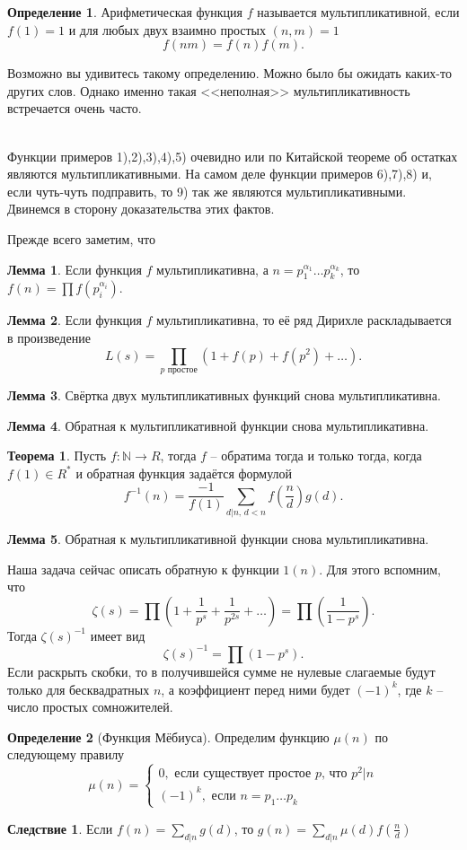 \documentclass[10pt,a4paper,oneside]{book}
\theoremstyle{definition}
\newtheorem{defn}{Определение}
\newtheorem{thm}{Теорема}
\newtheorem{lem}{Лемма}
\newtheorem{cor}{Следствие}
\newcommand{\mb}[1]{\mathbb{#1}}
\def\exm{\noindent {\bf Примеры:}}
\def\thrm{\begin{thm}}
\def\ethrm{\end{thm}}
\def\dfn{\begin{defn}}
\def\edfn{\end{defn}}
\def\lm{\begin{lem}}
\def\elm{\end{lem}}
\def\crl{\begin{cor}}
\def\ecrl{\end{cor}}
\begin{document}
\dfn Арифметическая функция $f$ называется мультипликативной, если $f(1)=1$ и для любых двух взаимно простых $(n,m)=1$ 
$$f(nm)=f(n)f(m).$$ 
\edfn
Возможно вы удивитесь такому определению. Можно было бы ожидать каких-то других слов. Однако именно такая <<неполная>> мультипликативность встречается очень часто.

\exm\\
Функции примеров 1),2),3),4),5) очевидно или по Китайской теореме об остатках являются мультипликативными. На самом деле функции примеров 6),7),8) и, если чуть-чуть подправить, то 9) так же являются мультипликативными. Двинемся в сторону доказательства этих фактов.

Прежде всего заметим, что 
\lm Если функция $f$ мультипликативна, а $n=p_1^{\alpha_1}\dots p_k^{\alpha_k}$, то $f(n)=\prod f(p_i^{\alpha_i})$.
\elm

\lm Если функция $f$ мультипликативна, то её ряд Дирихле раскладывается в произведение
$$L(s)=\prod_{p \text{ простое}} (1+f(p)+f(p^2)+\dots).$$
\elm

\lm Свёртка двух мультипликативных функций снова мультипликативна.
\elm

\lm Обратная к мультипликативной функции снова мультипликативна.
\elm

\thrm Пусть $f\colon \mb N \to R$, тогда $f$ -- обратима тогда и только тогда, когда $f(1)\in R^*$ и обратная функция задаётся формулой
$$f^{-1}(n)=\frac{-1}{f(1)}\sum_{d|n,\, d<n} f(\frac{n}{d})g(d).$$
\ethrm

\lm Обратная к мультипликативной функции снова мультипликативна.
\elm

Наша задача сейчас описать обратную к функции $1(n)$. Для этого вспомним, что $$\zeta(s)=\prod\left(1+\frac{1}{p^s}+\frac{1}{p^{2s}}+\dots\right)= \prod \left(\frac{1}{1-p^{s}}\right).$$
Тогда $\zeta(s)^{-1}$ имеет вид
$$\zeta(s)^{-1}=\prod(1-p^{s}).$$
Если раскрыть скобки, то в получившейся сумме не нулевые слагаемые будут только для бесквадратных $n$, а коэффициент перед ними будет $(-1)^k$, где $k$ -- число простых сомножителей.

\dfn[Функция Мёбиуса] Определим функцию $\mu(n)$ по следующему правилу
$$\mu(n)=\begin{cases}
0, \text{ если существует простое $p$, что $p^2|n$}\\
(-1)^k, \text{ если $n=p_1\dots p_k$}
\end{cases}$$
\edfn

\crl Если $f(n)=\sum_{d|n} g(d)$, то $g(n)=\sum_{d|n} \mu(d)f(\frac{n}{d})$
\ecrl
\end{document}
